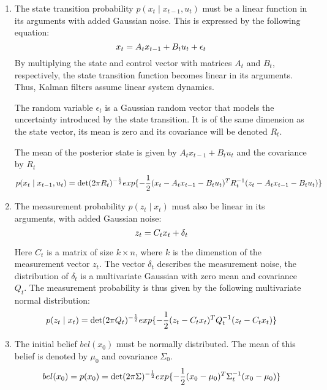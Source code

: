 \begin{enumerate}
  \item The state transition probability $p(x_t \mid x_{t-1}, u_t)$ must be a linear function in its arguments with added Gaussian noise. This is expressed by the following equation:
    \begin{equation}
      x_t = A_t x_{t-1} + B_t u_t + \epsilon_t \\
    \end{equation}
    By multiplying the state and control vector with matrices $A_t$ and $B_t$, respectively, the state transition function becomes linear in its arguments.
    Thus, Kalman filters assume linear system dynamics.

    The random variable $\epsilon_t$ is a Gaussian random vector that models the uncertainty introduced by the state transition.
    It is of the same dimension as the state vector, its mean is zero and its covariance will be denoted $R_t$.

    The mean of the posterior state is given by $A_t x_{t-1} + B_t u_t$ and the covariance by $R_t$
    \begin{equation}
      p(x_t \mid x_{t-1}, u_t) = \det(2\pi R_t)^{-\frac{1}{2}} exp{ \{-\frac{1}{2} (x_t - A_t x_{t-1} - B_t u_t)^T R_t^{-1} (z_t -A_t x_{t-1} - B_t u_t)\}} \\
    \end{equation}

  \item The measurement probability $p(z_t \mid x_t)$ must also be linear in its arguments, with added Gaussian noise:
    \begin{equation}
      z_t = C_t x_t + \delta_t \\
    \end{equation}

    Here $C_t$ is a matrix of size $k \times n$, where $k$ is the dimenstion of the measurement vector $z_t$.
    The vector $\delta_t$ describes the measurement noise, the distribution of $\delta_t$ is a multivariate Gaussian with zero mean and covariance $Q_t$.
    The measurement probability is thus given by the following multivariate normal distribution:
    \begin{equation}
      p(z_t \mid x_t) = \det(2\pi Q_t)^{-\frac{1}{2}} exp{ \{-\frac{1}{2} (z_t -C_t x_t)^T Q_t^{-1} (z_t - C_t x_t)\}} \\
    \end{equation}

  \item The initial belief $bel(x_0)$ must be normally distributed. The mean of this belief is denoted by $\mu_0$ and covariance $\Sigma_0$.
    \begin{equation}
      bel(x_0) = p(x_0) = \det(2\pi \Sigma) ^{-\frac{1}{2}} exp{ \{-\frac{1}{2} (x_0 - \mu_0)^T \Sigma_t^{-1} (x_0 - \mu_0)\}} \\
    \end{equation}

\end{enumerate}


